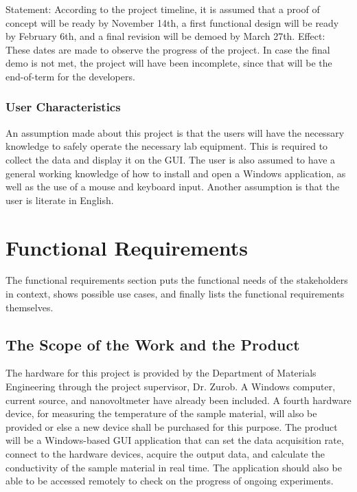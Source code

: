 \documentclass[12pt, titlepage]{article}
\begin{document}
\noindent Statement: According to the project timeline, it is assumed that a proof of concept will be ready by November 14th, a first functional design will be ready by February 6th, and a final revision will be demoed by March 27th.
Effect: These dates are made to observe the progress of the project. In case the final demo is not met, the project will have been incomplete, since that will be the end-of-term for the developers.

\subsubsection{User Characteristics}
An assumption made about this project is that the users will have the necessary knowledge to safely operate the necessary lab equipment. This is required to collect the data and display it on the GUI. 
The user is also assumed to have a general working knowledge of how to install and open a Windows application, as well as the use of a mouse and keyboard input. Another assumption is that the user is literate in English.

\section{Functional Requirements}
The functional requirements section puts the functional needs of the stakeholders in context, shows possible use cases, and finally lists the functional requirements themselves.

\subsection{The Scope of the Work and the Product}

The hardware for this project is provided by the Department of Materials Engineering through the project supervisor, Dr. Zurob. A Windows computer, current source, and nanovoltmeter have already been included. A fourth hardware device, for measuring the temperature of the sample material, will also be provided or else a new device shall be purchased for this purpose. The product will be a Windows-based GUI application that can set the data acquisition rate, connect to the hardware devices, acquire the output data, and calculate the conductivity of the sample material in real time. The application should also be able to be accessed remotely to check on the progress of ongoing experiments. \\
\end{document}
